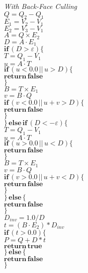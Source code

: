 \begin{minipage}[t]{.5\textwidth}
\raggedright
\textit{With Back-Face Culling}\\
\vspace{1em}
$Q = Q_2 - Q_1$\\
$E_1 = V_2 - V_1$\\
$E_2 = V_3 - V_1$\\
$A = Q \times E_2$\\
$D = A \cdot E_1$\\
$\mathbf{if} \, (D > \varepsilon) \{$\\
\quad $T = Q_1 - V_1$\\
\quad $u = A \cdot T$\\
\quad $\mathbf{if} \, (u < 0.0 \, || \, u > D) \{$\\
\quad \quad $\mathbf{return \, false}$\\
\quad $\}$\\
\quad $B = T \times E_1$\\
\quad $v = B \cdot Q$\\
\quad $\mathbf{if} \, (v < 0.0 \, || \, u + v > D) \{$\\
\quad \quad $\mathbf{return \, false}$\\
\quad $\}$\\
$\} \, \mathbf{else \, if} \, (D < -\varepsilon) \{$\\
\quad $T = Q_1 - V_1$\\
\quad $u = A \cdot T$\\
\quad $\mathbf{if} \, (u > 0.0 \, || \, u < D) \{$\\
\quad \quad $\mathbf{return \, false}$\\
\quad $\}$\\
\quad $B = T \times E_1$\\
\quad $v = B \cdot Q$\\
\quad $\mathbf{if} \, (v > 0.0 \, || \, u + v < D) \{$\\
\quad \quad $\mathbf{return \, false}$\\
\quad $\}$\\
$\} \, \mathbf{else} \, \{$\\
\quad $\mathbf{return \, false}$\\
$\}$\\
$D_{inv} = 1.0 / D$\\
$t = (B \cdot E_2) * D_{inv}$\\
$\mathbf{if} \, (t > 0.0) \{$\\
\quad $P = Q + D * t$\\
\quad $\mathbf{return \, true}$\\
$\} \, \mathbf{else} \, \{$\\
\quad $\mathbf{return \, false}$\\
$\}$
\end{minipage}%

